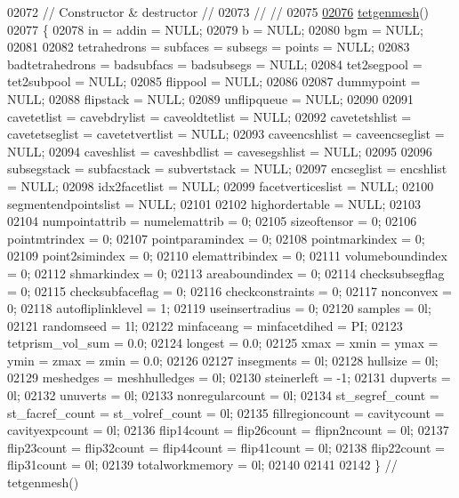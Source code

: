 \begin{DoxyCode}
02072 \textcolor{comment}{// Constructor & destructor                                                  //}
02073 \textcolor{comment}{//                                                                           //}
02075 \textcolor{comment}{}
\hypertarget{tetgen_8h_source.tex_l02076}{}\hyperlink{classtetgenmesh_adaad2fe67160e2d4564fcf20fcb841ee}{02076}   \hyperlink{classtetgenmesh_adaad2fe67160e2d4564fcf20fcb841ee}{tetgenmesh}()
02077   \{
02078     in  = addin = NULL;
02079     b   = NULL;
02080     bgm = NULL;
02081 
02082     tetrahedrons = subfaces = subsegs = points = NULL;
02083     badtetrahedrons = badsubfacs = badsubsegs = NULL;
02084     tet2segpool = tet2subpool = NULL;
02085     flippool = NULL;
02086 
02087     dummypoint = NULL;
02088     flipstack = NULL;
02089     unflipqueue = NULL;
02090 
02091     cavetetlist = cavebdrylist = caveoldtetlist = NULL;
02092     cavetetshlist = cavetetseglist = cavetetvertlist = NULL;
02093     caveencshlist = caveencseglist = NULL;
02094     caveshlist = caveshbdlist = cavesegshlist = NULL;
02095 
02096     subsegstack = subfacstack = subvertstack = NULL;
02097     encseglist = encshlist = NULL;
02098     idx2facetlist = NULL;
02099     facetverticeslist = NULL;
02100     segmentendpointslist = NULL;
02101 
02102     highordertable = NULL;
02103 
02104     numpointattrib = numelemattrib = 0;
02105     sizeoftensor = 0;
02106     pointmtrindex = 0;
02107     pointparamindex = 0;
02108     pointmarkindex = 0;
02109     point2simindex = 0;
02110     elemattribindex = 0;
02111     volumeboundindex = 0;
02112     shmarkindex = 0;
02113     areaboundindex = 0;
02114     checksubsegflag = 0;
02115     checksubfaceflag = 0;
02116     checkconstraints = 0;
02117     nonconvex = 0;
02118     autofliplinklevel = 1;
02119     useinsertradius = 0;
02120     samples = 0l;
02121     randomseed = 1l;
02122     minfaceang = minfacetdihed = PI;
02123     tetprism\_vol\_sum = 0.0;
02124     longest = 0.0;
02125     xmax = xmin = ymax = ymin = zmax = zmin = 0.0; 
02126 
02127     insegments = 0l;
02128     hullsize = 0l;
02129     meshedges = meshhulledges = 0l;
02130     steinerleft = -1;
02131     dupverts = 0l;
02132     unuverts = 0l;
02133     nonregularcount = 0l;
02134     st\_segref\_count = st\_facref\_count = st\_volref\_count = 0l;
02135     fillregioncount = cavitycount = cavityexpcount = 0l;
02136     flip14count = flip26count = flipn2ncount = 0l;
02137     flip23count = flip32count = flip44count = flip41count = 0l;
02138     flip22count = flip31count = 0l;
02139     totalworkmemory = 0l;
02140 
02141 
02142   \} \textcolor{comment}{// tetgenmesh()}

\end{DoxyCode}
